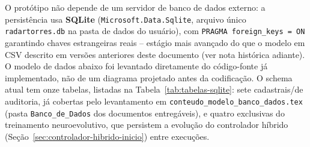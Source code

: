 \documentclass[12pt,a4paper]{article}
\begin{document}
O protótipo não depende de um servidor de banco de dados externo: a persistência usa
\textbf{SQLite} (\texttt{Microsoft.Data.Sqlite}, arquivo único \texttt{radartorres.db} na pasta de
dados do usuário), com \texttt{PRAGMA foreign\_keys = ON} garantindo chaves estrangeiras reais --
estágio mais avançado do que o modelo em CSV descrito em versões anteriores deste documento (ver
nota histórica adiante). O modelo de dados abaixo foi levantado diretamente do código-fonte já
implementado, não de um diagrama projetado antes da codificação. O schema atual tem onze tabelas,
listadas na Tabela~\ref{tab:tabelas-sqlite}:
sete cadastrais/de auditoria, já cobertas pelo levantamento em
\texttt{conteudo\_modelo\_banco\_dados.tex} (pasta \texttt{Banco\_de\_Dados} dos documentos
entregáveis), e quatro
exclusivas do treinamento neuroevolutivo, que persistem a evolução do controlador híbrido
(Seção~\ref{sec:controlador-hibrido-inicio}) entre execuções.
\end{document}
